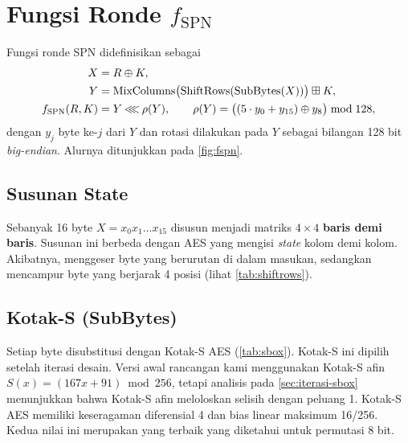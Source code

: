 \section{Fungsi Ronde \texorpdfstring{$f_{\text{SPN}}$}{f-SPN}}
\label{sec:fspn}
Fungsi ronde SPN didefinisikan sebagai
\begin{align}
    X &= R \oplus K, \nonumber\\
    Y &= \mathrm{MixColumns}\big(\mathrm{ShiftRows}(\mathrm{SubBytes}(X))\big) \boxplus K, \label{eq:fspn}\\
    f_{\text{SPN}}(R, K) &= Y \mathbin{\lll} \rho(Y), \qquad \rho(Y) = \big((5 \cdot y_0 + y_{15}) \oplus y_8\big) \bmod 128, \nonumber
\end{align}
dengan $y_j$ byte ke-$j$ dari $Y$ dan rotasi dilakukan pada $Y$ sebagai bilangan 128 bit \textit{big-endian}. Alurnya ditunjukkan pada \cref{fig:fspn}.

\subsection{Susunan State}
Sebanyak 16 byte $X = x_0 x_1 \dots x_{15}$ disusun menjadi matriks $4 \times 4$ \textbf{baris demi baris}. Susunan ini berbeda dengan AES yang mengisi \textit{state} kolom demi kolom. Akibatnya,  menggeser byte yang berurutan di dalam masukan, sedangkan  mencampur byte yang berjarak 4 posisi (lihat \cref{tab:shiftrows}).

\subsection{Kotak-S (SubBytes)}
Setiap byte disubstitusi dengan Kotak-S AES (\cref{tab:sbox}). Kotak-S ini dipilih setelah iterasi desain. Versi awal rancangan kami menggunakan Kotak-S afin $S(x) = (167x + 91) \bmod 256$, tetapi analisis pada \cref{sec:iterasi-sbox} menunjukkan bahwa Kotak-S afin meloloskan selisih  dengan peluang 1. Kotak-S AES memiliki keseragaman diferensial 4 dan bias linear maksimum 16/256. Kedua nilai ini merupakan yang terbaik yang diketahui untuk permutasi 8 bit.



